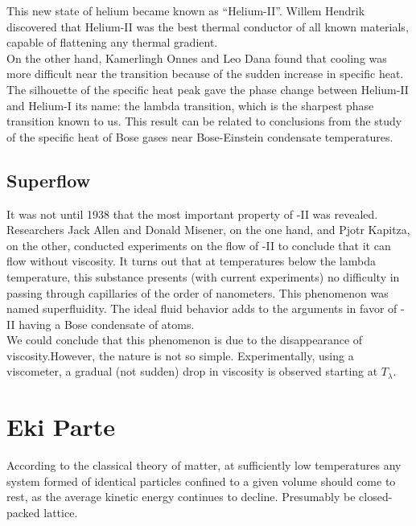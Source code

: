 \documentclass{article}
\begin{document}
This new state of helium became known as “Helium-II”. Willem Hendrik discovered that Helium-II was the best thermal conductor of all known materials, capable of flattening any thermal gradient. 
\\

On the other hand, Kamerlingh Onnes and Leo Dana found that cooling was more difficult near the transition because of the sudden increase in specific heat. The silhouette of the specific heat peak gave the phase change between Helium-II and Helium-I its name: the lambda transition, which is the sharpest phase transition known to us. This result can be related to conclusions from the study of the specific heat of Bose gases near Bose-Einstein condensate temperatures.
\\

\subsection{Superflow}

It was not until 1938 that the most important property of -II was revealed.
Researchers Jack Allen and Donald Misener, on the one hand, and Pjotr Kapitza, on the other, conducted experiments on the flow of -II to conclude that it can flow without viscosity. It turns out that at temperatures below the lambda temperature, this substance presents (with current experiments) no difficulty in passing through capillaries of the order of nanometers. This phenomenon was named superfluidity. The ideal fluid behavior adds to the arguments in favor of -II having a Bose condensate of  atoms.
\\

We could conclude that this phenomenon is due to the disappearance of viscosity.However, the nature is not so simple. Experimentally, using a viscometer, a gradual (not sudden) drop in viscosity is observed starting at $T_\lambda$.
\\

\section{Eki Parte}
According to the classical theory of matter, at sufficiently low temperatures any system formed of identical particles confined to a given volume should come to rest, as the average kinetic energy continues to decline. Presumably be closed-packed lattice.
\end{document}
